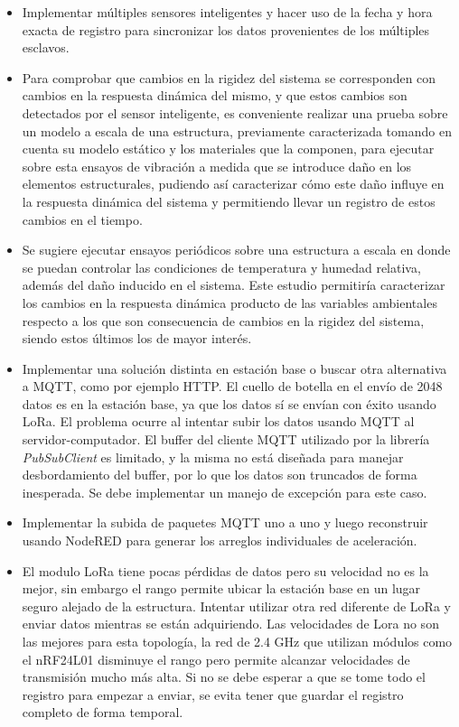  
\begin{itemize}

    \item Implementar múltiples sensores inteligentes y hacer uso de la fecha y hora exacta de registro para sincronizar los datos provenientes de los múltiples esclavos. 
    
    
    \item Para comprobar que cambios en la rigidez del sistema se corresponden con cambios en la respuesta dinámica del mismo, y que estos cambios son detectados por el sensor inteligente, es conveniente realizar una prueba sobre un modelo a escala de una estructura, previamente caracterizada tomando en cuenta su modelo estático y los materiales que la componen, para ejecutar sobre esta ensayos de vibración a medida que se introduce daño en los elementos estructurales, pudiendo así caracterizar cómo este daño influye en la respuesta dinámica del sistema y permitiendo llevar un registro de estos cambios en el tiempo.
    
    
    \item Se sugiere ejecutar ensayos periódicos sobre una estructura a escala en donde se puedan controlar las condiciones de temperatura y humedad relativa, además del daño inducido en el sistema. Este estudio permitiría caracterizar los cambios en la respuesta dinámica producto de las variables ambientales respecto a los que son consecuencia de cambios en la rigidez del sistema, siendo estos últimos los de mayor interés.
 
 \item Implementar una solución distinta en estación base o buscar otra alternativa a MQTT, como por ejemplo HTTP. El cuello de botella en el envío de 2048 datos es en la estación base, ya que los datos sí se envían con éxito usando LoRa. El problema ocurre al intentar subir los datos usando MQTT al servidor-computador. El buffer del cliente MQTT utilizado por la librería \textit{PubSubClient} es limitado, y la misma no está diseñada para manejar desbordamiento del buffer, por lo que los datos son truncados de forma inesperada. Se debe implementar un manejo de excepción para este caso. 
 
 \item Implementar la subida de paquetes MQTT uno a uno y luego reconstruir usando NodeRED para generar los arreglos individuales de aceleración.
 
 \item El modulo LoRa tiene pocas pérdidas de datos pero su velocidad no es la mejor, sin embargo el rango permite ubicar la estación base en un lugar seguro alejado de la estructura. Intentar utilizar otra red diferente de LoRa y enviar datos mientras se están adquiriendo. Las velocidades de Lora no son las mejores para esta topología, la red de 2.4 GHz que utilizan módulos como el nRF24L01 disminuye el rango pero permite alcanzar velocidades de transmisión mucho más alta. Si no se debe esperar a que se tome todo el registro para empezar a enviar, se evita tener que guardar el registro completo de forma temporal.
 

\end{itemize}
